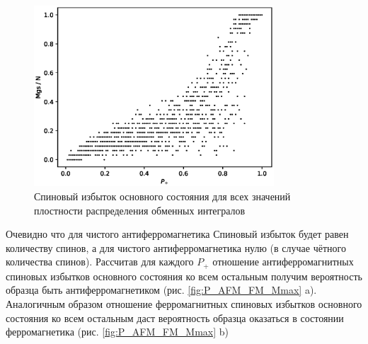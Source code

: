 \documentclass[utf8, babel, sor, jor, amsmath, amssymb, reprint]{elsarticle} %
\begin{document}
\begin{figure}[H]
	\centering
	\includegraphics[width=0.8\textwidth]{images/Mgs(P+).eps}
	\caption{Спиновый избыток основного состояния для всех значений плостности распределения обменных интегралов}
	\label{fig:Mgs(P+)}
\end{figure}

Очевидно что для чистого антиферромагнетика Спиновый избыток будет равен количеству спинов, а для чистого антиферромагнетика нулю (в случае чётного количества спинов). Рассчитав для каждого $P_+$ отношение антиферромагнитных спиновых избытков основного состояния ко всем остальным получим вероятность образца быть антиферромагнетиком (рис. \ref{fig:P_AFM_FM_Mmax} a). Аналогичным образом отношение ферромагнитных спиновых избытков основного состояния ко всем остальным даст вероятность образца оказаться в состоянии ферромагнетика (рис. \ref{fig:P_AFM_FM_Mmax} b)
\end{document}
